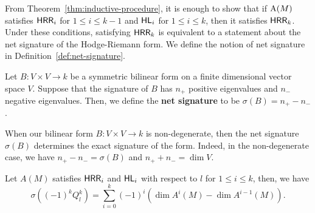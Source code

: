 \documentclass{puthesis-UG}
\begin{document}
From Theorem~\ref{thm:inductive-procedure}, it is enough to show that if $\operatorname{A}(M)$ satisfies $\mathsf{HRR}_i$ for $1 \leq i \leq k-1$ and $\mathsf{HL}_i$ for $1 \leq i \leq k$, then it satisfies $\mathsf{HRR}_k$. Under these conditions, satisfying $\mathsf{HRR}_k$ is equivalent to a statement about the net signature of the Hodge-Riemann form. We define the notion of net signature in Definition~\ref{def:net-signature}. 

\begin{defn} \label{def:net-signature}
	Let $B : V \times V \to k$ be a symmetric bilinear form on a finite dimensional vector space $V$. Suppose that the signature of $B$ has $n_+$ positive eigenvalues and $n_-$ negative eigenvalues. Then, we define the \textbf{net signature} to be $\sigma(B) = n_+ - n_-$. 
\end{defn}

When our bilinear form $B : V \times V \to k$ is non-degenerate, then the net signature $\sigma (B)$ determines the exact signature of the form. Indeed, in the non-degenerate case, we have $n_+ - n_- = \sigma(B)$ and $n_+ + n_- = \dim V$. 
\begin{lem} \label{formula-for-dimension-when-HRR-HL-are-satisfied}
	Let $A(M)$ satisfies $\mathsf{HRR}_i$ and $\mathsf{HL}_i$ with respect to $l$ for $1 \leq i \leq k$, then, we have 
	\[
		\sigma \left ( (-1)^kQ_l^k \right ) = \sum_{i = 0}^k (-1)^i (\dim A^i(M) - \dim A^{i-1}(M)).
	\]
\end{lem}
\end{document}
